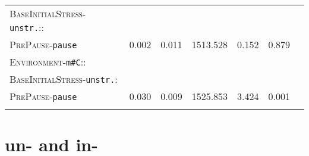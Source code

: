 \begin{table}[H]
{\begin{tabular}{lSSSSSS}
		\textsc{BaseInitialStress}-\texttt{unstr.}::&&&&&\\
		\textsc{PrePause}-\texttt{pause} & \color{lsLightGray}0.002 & \color{lsLightGray}0.011 & \color{lsLightGray}1513.528 & \color{lsLightGray}0.152 &\color{lsLightGray}0.879 \\ 
		\textsc{Environment}-\texttt{m\#C}::&&&&&\\
		\textsc{BaseInitialStress}-\texttt{unstr.}:&&&&&\\
		\textsc{PrePause}-\texttt{pause }& 0.030 & 0.009 & 1525.853 & 3.424 & 0.001 \\ 
		\lspbottomrule 
			\end{tabular}}
\end{table}
\clearpage

\section{{un-} and in-}



